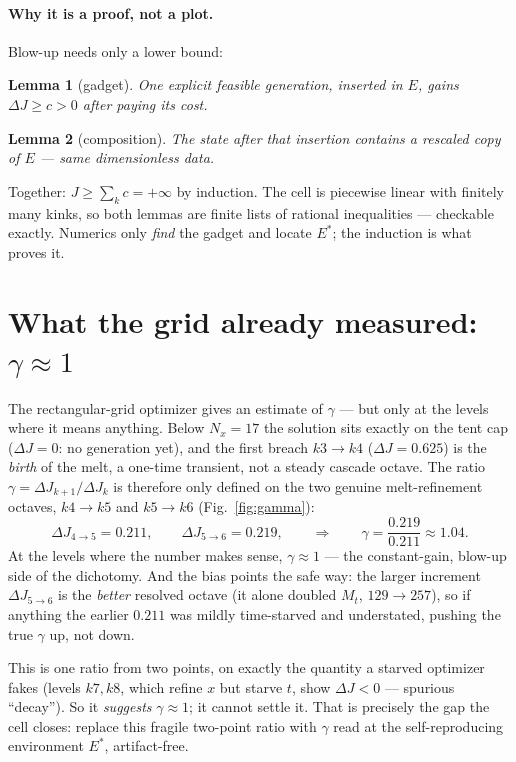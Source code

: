 \documentclass[11pt]{article}
\newtheorem{lemma}{Lemma}
\begin{document}
\paragraph{Why it is a proof, not a plot.} Blow-up needs only a lower bound:
\begin{lemma}[gadget]
One explicit feasible generation, inserted in $E$, gains $\Delta J\ge c>0$
after paying its cost.
\end{lemma}
\begin{lemma}[composition]
The state after that insertion contains a rescaled copy of $E$ --- same
dimensionless data.
\end{lemma}
\noindent Together: $J\ge\sum_k c=+\infty$ by induction. The cell is
piecewise linear with finitely many kinks, so both lemmas are finite lists
of rational inequalities --- checkable exactly. Numerics only \emph{find}
the gadget and locate $E^\ast$; the induction is what proves it.

\section{What the grid already measured: $\gamma\approx1$}

The rectangular-grid optimizer gives an estimate of $\gamma$ --- but only at
the levels where it means anything. Below $N_x=17$ the solution sits exactly
on the tent cap ($\Delta J=0$: no generation yet), and the first breach
$k3\!\to\!k4$ ($\Delta J=0.625$) is the \emph{birth} of the melt, a one-time
transient, not a steady cascade octave. The ratio $\gamma=\Delta
J_{k+1}/\Delta J_k$ is therefore only defined on the two genuine
melt-refinement octaves, $k4\!\to\!k5$ and $k5\!\to\!k6$
(Fig.~\ref{fig:gamma}):
\[
\Delta J_{4\to5}=0.211,\qquad \Delta J_{5\to6}=0.219,
\qquad\Longrightarrow\qquad
\gamma=\frac{0.219}{0.211}\approx 1.04 .
\]
At the levels where the number makes sense, \textbf{$\gamma\approx1$} ---
the constant-gain, blow-up side of the dichotomy. And the bias points the
safe way: the larger increment $\Delta J_{5\to6}$ is the \emph{better}
resolved octave (it alone doubled $M_t$, $129\!\to\!257$), so if anything the
earlier $0.211$ was mildly time-starved and understated, pushing the true
$\gamma$ up, not down.

This is one ratio from two points, on exactly the quantity a starved
optimizer fakes (levels $k7,k8$, which refine $x$ but starve $t$, show
$\Delta J<0$ --- spurious ``decay''). So it \emph{suggests} $\gamma\approx1$;
it cannot settle it. That is precisely the gap the cell closes: replace this
fragile two-point ratio with $\gamma$ read at the self-reproducing
environment $E^\ast$, artifact-free.
\end{document}
